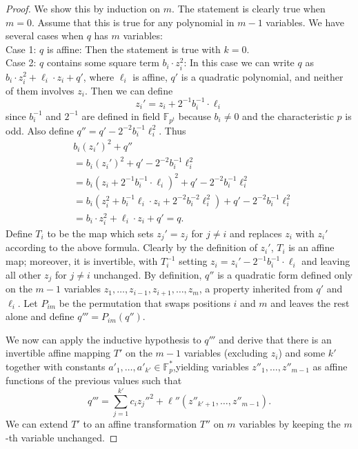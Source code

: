 \begin{proof}
We show this by induction on $m$. The statement is clearly true when $m=0$.
Assume that this is true for any polynomial in $m-1$ variables.
We have several cases when $q$ has $m$ variables:\\
{\sc Case 1:} $q$ is affine: Then the statement is true with $k=0$.\\
{\sc Case 2:} $q$ contains some square term $b_i\cdot z_i^2$:
In this case we can write $q$ as
$b_i\cdot z_i^2+ \ell_i\cdot z_i+q'$,
where $\ell_i$ is affine, $q'$ is a quadratic polynomial,
and neither of them involves $z_i$.
Then we can define
$$z_i'=z_i+2^{-1}b_i^{-1}\cdot \ell_i$$
since $b_i^{-1}$ and $2^{-1}$ are defined in
field $\mathbb{F}_{p^t}$ because $b_i\ne 0$ and the characteristic $p$ is odd.
Also define $q''=q'-2^{-2}b_i^{-1}\ell_i^2$. 
Thus 
\begin{align*}
&b_i(z_i')^2+q''\\
&=b_i(z_i')^2+q'-2^{-2}b_i^{-1}\ell_i^2\\
&=b_i(z_i +2^{-1}b_i^{-1}\cdot \ell_i)^2+q'-2^{-2} b_i^{-1}\ell_i^2\\
&=b_i(z_i^2 + b_i^{-1}\ell_i \cdot z_i + 2^{-2}b_i^{-2}\ell_i^2)
+q'-2^{-2} b_i^{-1}\ell_i^2\\
&=b_i\cdot z_i^2 + \ell_i \cdot z_i +q' =q.
\end{align*}
Define $T_i$ to be the map which sets $z_j'=z_j$ for
$j\ne i$ and replaces $z_i$ with $z_i'$ according to the above
formula.
Clearly by the definition of $z_i'$, $T_i$ is an affine map; moreover,
it is invertible, with $T_i^{-1}$ setting $z_i=z_i' -2^{-1}b_i^{-1}\cdot \ell_i$
and leaving all other $z_j$ for $j\ne i$ unchanged.
By definition, $q''$ is a quadratic form defined only on the $m-1$ variables
$z_1,\ldots,z_{i-1},z_{i+1},\ldots,z_m$, a property inherited from $q'$ and
$\ell_i$.  Let $P_{im}$ be the permutation that swaps positions $i$ and
$m$ and leaves the rest alone and define $q'''=P_{im}(q'')$.

We now can apply the inductive hypothesis to $q'''$ and derive that there
is an invertible affine mapping $T'$ on the $m-1$ variables (excluding $z_i$)
and some $k'$ together with constants $a'_{1},\ldots,a'_{k'}\in \mathbb{F}_p^*$,yielding variables $z''_1,\ldots,z''_{m-1}$ as affine functions of the
previous values such that 
$$q'''=\sum_{j=1}^{k'} c_i{z_{j}''}^2+\ell''(z''_{k'+1},\ldots,z''_{m-1}).$$
We can extend $T'$ to an affine transformation $T''$ on $m$ variables 
by keeping the $m$-th variable unchanged.  


\end{proof}
